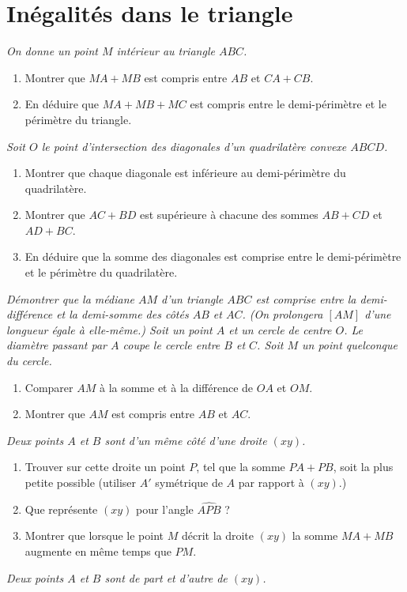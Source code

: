 \chapter{Inégalités dans le triangle}

\begin{itemize}
\it On donne un point $M$ intérieur au triangle $ABC$. 
\begin{enumerate}
\item Montrer que $MA+MB$ est compris entre $AB$ et $CA+CB$.
\item En déduire que $MA+MB+MC$ est compris entre le demi-périmètre et le périmètre du triangle.
\end{enumerate}
\it Soit $O$ le point d'intersection des diagonales d'un quadrilatère convexe $ABCD$. \begin{enumerate}
\item Montrer que chaque diagonale est inférieure au demi-périmètre du quadrilatère.
\item Montrer que $AC+BD$ est supérieure à chacune des sommes $AB+CD$ et $AD+BC$.
\item En déduire que la somme des diagonales est comprise entre le demi-périmètre et le périmètre du quadrilatère.
\end{enumerate}
\it Démontrer que la médiane $AM$ d'un triangle $ABC$ est comprise entre la demi-différence et la demi-somme des côtés $AB$ et $AC$. (On prolongera $[AM]$ d'une longueur égale à elle-même.)
\it Soit un point $A$ et un cercle de centre $O$. Le diamètre passant par $A$ coupe le cercle entre $B$ et $C$. Soit $M$ un point quelconque du cercle. \begin{enumerate}
\item Comparer $AM$ à la somme et à la différence de $OA$ et $OM$.
\item Montrer que $AM$ est compris entre $AB$ et $AC$.
\end{enumerate}
\it Deux points $A$ et $B$ sont d'un même côté d'une droite $(xy)$. \begin{enumerate}
\item Trouver sur cette droite un point $P$, tel que la somme $PA+PB$, soit la plus petite possible (utiliser $A'$ symétrique de $A$ par rapport à $(xy)$.)
\item Que représente $(xy)$ pour l'angle $\widehat{APB}$ ?
\item Montrer que lorsque le point $M$ décrit la droite $(xy)$ la somme $MA+MB$ augmente en même temps que $PM$. 
\end{enumerate}
\it Deux points $A$ et $B$ sont de part et d'autre de $(xy)$. \begin{enumerate}

\end{enumerate}
\end{itemize}
